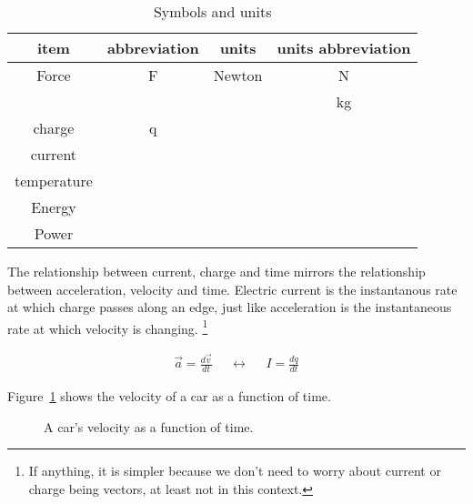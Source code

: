 \par
\begin{table}[H]
\begin{center}
\begin{tabular}{|c|c|c|c|} \hline
item	&	abbreviation & units & units abbreviation \\ \hline
Force	&	F	& Newton	& N\\ \hline
	&		&	&	kg	\\ \hline
charge	& q	&&	\\ \hline
current		&&&	\\ \hline
temperature		&&&	\\ \hline
Energy	&&&	\\ \hline
Power	&&&	\\ \hline
\end{tabular}
\caption{Symbols and units}
\label{F:2SU}
\end{center}
\end{table}

\noindent
The relationship between current, charge and time mirrors the relationship between acceleration, velocity and time. Electric current is the instantanous rate at which charge passes along an edge, just like acceleration is the instantaneous rate at which velocity is changing. \footnote{If anything, it is simpler because we don't need to worry about current or charge being vectors, at least not in this context.} 

\par
\begin{align}
\vec{a} = \frac{d\vec{v}}{dt}&&\leftrightarrow&&I = \frac{dq}{dt}
\end{align}
\par
Figure~\ref{F:2CAR} shows the velocity of a car as a function of time.
\par
\begin{figure}[H]
\begin{center}
\caption{A car's velocity as a function of time.}
\label{F:2CAR}
\end{center}
\end{figure}

